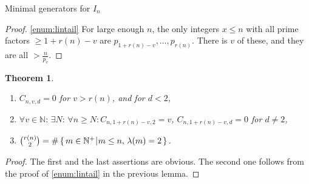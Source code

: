 \documentclass[reqno,10pt]{amsart}
\theoremstyle{definition}
\theoremstyle{remark}
\theoremstyle{plain}
\newtheorem{thm}[definition]{Theorem}
\newcommand{\Nat}{{\mathbb{N}}}
\def\setsuchas#1#2{\left\{\,{#1}\,\vrule\,{#2}\,\right\}}
\begin{document}
\begin{section}{Minimal generators for \(I_n\)}
\begin{proof}
    \eqref{enum:lintail}
    For large enough \(n\), the only integers \(x \le n\) with all
    prime factors \(\ge 1 + r(n) -v\) are
    \(p_{1+r(n)-v},\dots,p_{r(n)}\). There is \(v\) of these, and they
    are all \(> \frac{n}{p_v}\).
  \end{proof}



 \begin{thm} \label{thm:bcg}
    \begin{enumerate}
    \item \(C_{n,v,d}=0\) for \(v > r(n)\), and for \(d < 2\),
    \item \(\forall v \in \Nat: \, \exists N: \, \forall n \ge N:
      C_{n,1+r(n)-v,2} = v\), \(C_{n,1+r(n)-v,d} = 0\) for \(d \neq
      2\), 
    \item \(\binom{r(n)}{2} = \#\setsuchas{m \in \Nat^+}{m \le n, \,
        \lambda(m)=2}\). 
    \end{enumerate}
  \end{thm}
  \begin{proof}
    The first and the last assertions are obvious. The second one
    follows from the 
    proof of \eqref{enum:lintail} in the previous lemma. 
  \end{proof}


\end{section}
\end{document}
